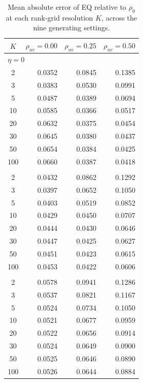\begin{table}[!t]
\caption{Mean absolute error of EQ relative to $\rho_0$ at each rank-grid resolution $K$, across the nine generating settings.}
\label{tab:supp_mae_eq}
\centering\small\setlength{\tabcolsep}{7pt}
\begin{tabular}{crrr}
\toprule
$K$ & $\rho_{uv}=0.00$ & $\rho_{uv}=0.25$ & $\rho_{uv}=0.50$ \\
\midrule
\multicolumn{4}{l}{\textit{$\eta=0$}} \\
2 & 0.0352 & 0.0845 & 0.1385 \\
3 & 0.0383 & 0.0530 & 0.0991 \\
5 & 0.0487 & 0.0389 & 0.0694 \\
10 & 0.0585 & 0.0366 & 0.0517 \\
20 & 0.0632 & 0.0375 & 0.0454 \\
30 & 0.0645 & 0.0380 & 0.0437 \\
50 & 0.0654 & 0.0384 & 0.0425 \\
100 & 0.0660 & 0.0387 & 0.0418 \\
\addlinespace[4pt]
\multicolumn{4}{l}{\textit{$\eta=2$}} \\
2 & 0.0432 & 0.0862 & 0.1292 \\
3 & 0.0397 & 0.0652 & 0.1050 \\
5 & 0.0403 & 0.0519 & 0.0852 \\
10 & 0.0429 & 0.0450 & 0.0707 \\
20 & 0.0444 & 0.0430 & 0.0646 \\
30 & 0.0447 & 0.0425 & 0.0627 \\
50 & 0.0451 & 0.0423 & 0.0615 \\
100 & 0.0453 & 0.0422 & 0.0606 \\
\addlinespace[4pt]
\multicolumn{4}{l}{\textit{$\eta=4$}} \\
2 & 0.0578 & 0.0941 & 0.1286 \\
3 & 0.0537 & 0.0821 & 0.1167 \\
5 & 0.0524 & 0.0734 & 0.1050 \\
10 & 0.0521 & 0.0677 & 0.0959 \\
20 & 0.0522 & 0.0656 & 0.0914 \\
30 & 0.0524 & 0.0649 & 0.0900 \\
50 & 0.0525 & 0.0646 & 0.0890 \\
100 & 0.0526 & 0.0644 & 0.0884 \\
\bottomrule
\end{tabular}
\end{table}
